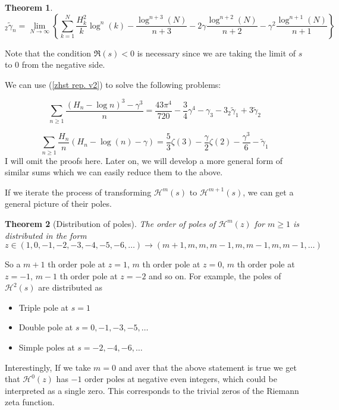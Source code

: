 \documentclass{article}
\newcommand{\pHz}[2]{\mathcal{H}^{#1}(#2)}
\newcommand{\HSt}[1]{\tilde{\gamma}_{#1}}
\newcommand{\zHSt}[1]{{}_2\tilde{\gamma}_{#1}}
\newtheorem{theorem}{Theorem}
\begin{document}
 \begin{theorem}
     \begin{equation}\label{zhst rep. v2}
         \zHSt{n}=\lim_{N\to \infty}\left\{\sum_{k= 1}^N \frac{H_k^2}{k} \log^n(k)-\frac{\log^{n+3}(N)}{n+3}-2\gamma \frac{\log^{n+2}(N)}{n+2}-\gamma^2 \frac{\log^{n+1}(N)}{n+1}\right\}
     \end{equation}
 \end{theorem}

Note that the condition $\Re (s)<0$ is necessary since we are taking the limit of $s$ to $0$ from the negative side.
 
 We can use (\ref{zhst rep. v2}) to solve the following problems:

 \begin{equation}\label{Problem from Vincent}
         \sum_{n\geq 1} \frac{(H_n-\log n)^3-\gamma^3}{n}=\frac{43 \pi^4}{720}-\frac{3}{4}\gamma^4-\gamma_3 -3\zHSt{1} +3\HSt{2}
    \end{equation}
    
\begin{equation}\label{Harmonic summ} \sum_{n\geq 1}\frac{H_n}{n}\left(H_n-\log(n)-\gamma\right)=\frac{5}{3}\zeta(3)-\frac{\gamma}{2}\zeta(2)-\frac{\gamma^3}{6}-\HSt{1}\end{equation}
I will omit the proofs here. Later on, we will develop a more general form of similar sums which we can easily reduce them to the above.



If we iterate the process of transforming $\pHz{m}{s}$ to $\pHz{m+1}{s}$, we can get a general picture of their poles.

\begin{theorem}[Distribution of poles]\label{Distribution of poles of H}
    The order of poles of $\pHz{m}{z}$ for $m\geq 1$ is distributed in the form
    \begin{equation}
        z\in (1,0,-1,-2,-3,-4,-5,-6, \ldots ) \longrightarrow (m+1,m,m,m-1,m,m-1,m,m-1,\ldots )
    \end{equation}
\end{theorem}

So a $m+1$ th order pole at $z=1$, $m$ th order pole at $z=0$, $m$ th order pole at $z=-1$, $m-1$ th order pole at $z=-2$ and so on. For example,
the poles of $\pHz{2}{s}$ are distributed as
\begin{itemize}
    \item Triple pole at $s=1$
    \item Double pole at $s=0,-1,-3,-5, \ldots$
    \item Simple poles at $s=-2,-4,-6 , \ldots$
\end{itemize}
Interestingly, If we take $m=0$ and aver that the above statement is true we get that $\mathcal{H}^{0}(z)$ has $-1$ order poles at negative even integers, which could be interpreted as a single zero. This corresponds to the trivial zeros of the Riemann zeta function.
\end{document}
